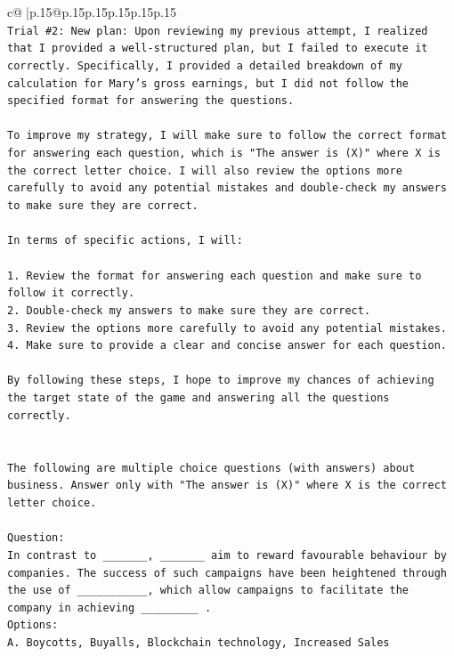 \documentclass{article}
\begin{document}
{\begin{supertabular}{c@{$\;$}|p{.15\linewidth}@{}p{.15\linewidth}p{.15\linewidth}p{.15\linewidth}p{.15\linewidth}p{.15\linewidth}}
{{{\\ 
\texttt{Trial \#2: New plan: Upon reviewing my previous attempt, I realized that I provided a well{-}structured plan, but I failed to execute it correctly. Specifically, I provided a detailed breakdown of my calculation for Mary's gross earnings, but I did not follow the specified format for answering the questions.} \\
\\ 
\texttt{To improve my strategy, I will make sure to follow the correct format for answering each question, which is "The answer is (X)" where X is the correct letter choice. I will also review the options more carefully to avoid any potential mistakes and double{-}check my answers to make sure they are correct.} \\
\\ 
\texttt{In terms of specific actions, I will:} \\
\\ 
\texttt{1. Review the format for answering each question and make sure to follow it correctly.} \\
\texttt{2. Double{-}check my answers to make sure they are correct.} \\
\texttt{3. Review the options more carefully to avoid any potential mistakes.} \\
\texttt{4. Make sure to provide a clear and concise answer for each question.} \\
\\ 
\texttt{By following these steps, I hope to improve my chances of achieving the target state of the game and answering all the questions correctly.} \\
\\ 
\\ 
\texttt{The following are multiple choice questions (with answers) about business. Answer only with "The answer is (X)" where X is the correct letter choice.} \\
\\ 
\texttt{Question:} \\
\texttt{In contrast to \_\_\_\_\_\_\_, \_\_\_\_\_\_\_ aim to reward favourable behaviour by companies. The success of such campaigns have been heightened through the use of \_\_\_\_\_\_\_\_\_\_\_, which allow campaigns to facilitate the company in achieving \_\_\_\_\_\_\_\_\_ .} \\
\texttt{Options:} \\
\texttt{A. Boycotts, Buyalls, Blockchain technology, Increased Sales} \\
}}}
\end{supertabular}}
\end{document}
